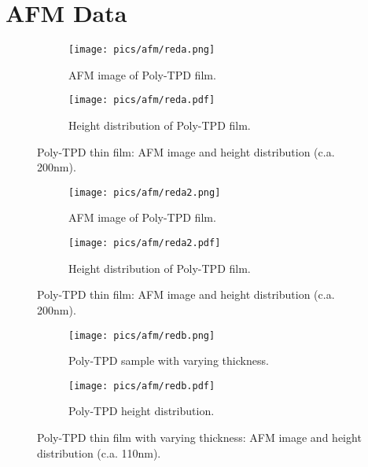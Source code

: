 \appendix



\chapter{AFM Data}

\begin{figure}[!htb]
\centering
\begin{subfigure}[t]{.5\textwidth}
  \centering
  \texttt{[image: pics/afm/reda.png]}
  \caption{AFM image of Poly-TPD film.}
  \label{PolyTPD_AFM}
\end{subfigure}%
\begin{subfigure}[t]{.5\textwidth}
  \centering
  \texttt{[image: pics/afm/reda.pdf]}
  \caption{Height distribution of Poly-TPD film.}
  \label{PolyTPD_HeightDist}
\end{subfigure}
\caption{Poly-TPD thin film: AFM image and height distribution (c.a. 200nm).}
\end{figure}

\begin{figure}[!htb]
\centering
\begin{subfigure}[t]{.5\textwidth}
  \centering
  \texttt{[image: pics/afm/reda2.png]}
  \caption{AFM image of Poly-TPD film.}
  \label{PolyTPD_AFM}
\end{subfigure}%
\begin{subfigure}[t]{.5\textwidth}
  \centering
  \texttt{[image: pics/afm/reda2.pdf]}
  \caption{Height distribution of Poly-TPD film.}
  \label{PolyTPD_HeightDist}
\end{subfigure}
\caption{Poly-TPD thin film: AFM image and height distribution (c.a. 200nm).}
\end{figure}



\begin{figure}[!htb]
\centering
\begin{subfigure}[t]{.5\textwidth}
  \centering
  \texttt{[image: pics/afm/redb.png]}
  \caption{Poly-TPD sample with varying thickness.}
  \label{PolyTPD_VaryingThickness}
\end{subfigure}%
\begin{subfigure}[t]{.5\textwidth}
  \centering
  \texttt{[image: pics/afm/redb.pdf]}
  \caption{Poly-TPD height distribution.}
  \label{PolyTPD_HeightDistRedb}
\end{subfigure}
\caption{Poly-TPD thin film with varying thickness: AFM image and height distribution (c.a. 110nm).}
\end{figure}


